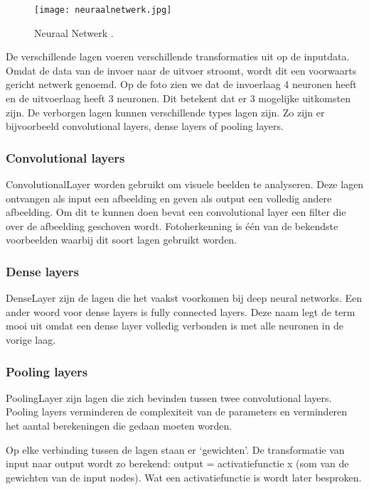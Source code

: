 \begin{figure}[!ht]
    \texttt{[image: neuraalnetwerk.jpg]}
    \caption{\label{neuraalnetwerk}Neuraal Netwerk \autocite{KULeuven2019}.}
\end{figure}

De verschillende lagen voeren verschillende transformaties uit op de inputdata. Omdat de data van de invoer naar de uitvoer stroomt, wordt dit een voorwaarts gericht netwerk genoemd. Op de foto zien we dat de invoerlaag 4 neuronen heeft en de uitvoerlaag heeft 3 neuronen. Dit betekent dat er 3 mogelijke uitkomsten zijn. De verborgen lagen kunnen verschillende types lagen zijn. Zo zijn er bijvoorbeeld convolutional layers, dense layers of pooling layers. 

\subsubsection{Convolutional layers}
\label{sec:convolutionallayers}
\gls{ConvolutionalLayer} worden gebruikt om visuele beelden te analyseren. Deze lagen ontvangen als input een afbeelding en geven als output een volledig andere afbeelding. Om dit te kunnen doen bevat een convolutional layer een filter die over de afbeelding geschoven wordt. Fotoherkenning is één van de bekendste voorbeelden waarbij dit soort lagen gebruikt worden. \autocite{Nanculef2020}


\subsubsection{Dense layers}
\label{sec:denselayers}
\gls{DenseLayer} zijn de lagen die het vaakst voorkomen bij deep neural networks. Een ander woord voor dense layers is fully connected layers. Deze naam legt de term mooi uit omdat een dense layer volledig verbonden is met alle neuronen in de vorige laag. \autocite{Balachandran2020}


\subsubsection{Pooling layers}
\label{sec:poolinglayers}
\gls{PoolingLayer} zijn lagen die zich bevinden tussen twee convolutional layers. Pooling layers verminderen de complexiteit van de parameters en verminderen het aantal berekeningen die gedaan moeten worden. \autocite{Nanculef2020}

Op elke verbinding tussen de lagen staan er ‘gewichten’. De transformatie van input naar output wordt zo berekend:
output = activatiefunctie x (som van de gewichten van de input nodes). \autocite{Vervoort2017} Wat een activatiefunctie is wordt later besproken. 

